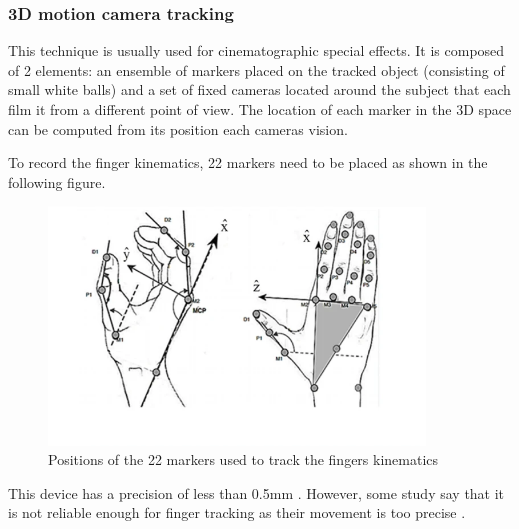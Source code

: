 \documentclass{article}
\begin{document}
	
	\subsubsection{3D motion camera tracking}
	
	This technique is usually used for cinematographic special effects. It is composed of 2 elements: an ensemble of markers placed on the tracked object (consisting of small white balls) and a set of fixed cameras located around the subject that each film it from a different point of view. The location of each marker in the 3D space can be computed from its position each cameras vision.
	
	To record the finger kinematics, 22 markers need to be placed as shown in the following figure.
	
	\begin{figure}[h]
		\centering
		\includegraphics[width=10cm]{images/motionCaptureMarker.png}
		\caption{Positions of the 22 markers used to track the fingers kinematics \cite{ref:Ngeo2014}}
		\label{fig:cyberGlove3}
	\end{figure}
	
	This device has a precision of less than 0.5mm \cite{ref:Ngeo2014}. However, some study say that it is not reliable enough for finger tracking as their movement is too precise \cite{ref:KinMusUji}.
	
	
\end{document}
